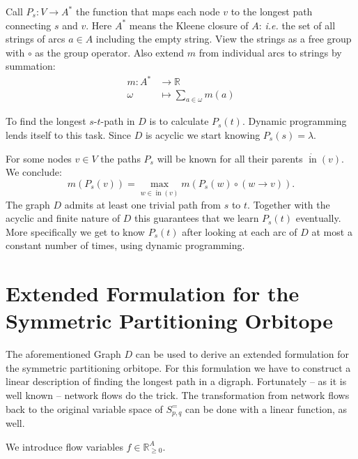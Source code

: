 \documentclass[a4paper]{amsart}
\theoremstyle{lemma}
\theoremstyle{definition}
\theoremstyle{remark}
\theoremstyle{example}
\def\ie{\emph{i.e.}}
\DeclareMathOperator{\In}{in}
\newcommand{\inv}{\ensuremath{\dot{\In}}}
\newcommand{\lr}[1]{\ensuremath{\left( #1 \right)}}
\begin{document}
Call \(P_s \colon V \to A^* \) the function that maps each node \(v\)
to the longest path connecting \(s\) and \(v\).  Here \(A^*\) means
the Kleene closure of \(A\): \ie{} the set of all strings of arcs \(a
\in A\) including the empty string.  View the strings as a free group
with \(\circ{}\) as the group operator.  Also extend \(m\) from individual arcs to strings by summation:
\begin{align*}
m \colon A^* &\to \mathbb{R} \\
\omega &\mapsto \sum_{a\in \omega} m \lr{a}
\end{align*}

To find the longest \(s\)-\(t\)-path in \(D\) is to calculate
\(P_s (t)\).  Dynamic programming lends itself to this task.  Since
\(D\) is acyclic we start knowing \(P_s (s) = \lambda\).

For some nodes \(v \in V\) the paths \(P_s\) will be known for all their parents \(\inv{} \lr{v} \).  We conclude:
\[m\lr{P_s \lr{v}} = \max_{w \in \inv(v)}
m\lr{P_s(w) \circ{} \lr{w \rightarrow v }}\text{.}\]
The graph \(D\) admits at least one trivial path from \(s\) to \(t\).
Together with the acyclic and finite nature of \(D\) this guarantees that we
learn \(P_s (t)\) eventually.  More specifically we get to know \(P_s
(t)\) after looking at each arc of \(D\) at most a constant number of
times, using dynamic programming.




\section{Extended Formulation for the Symmetric Partitioning Orbitope}
The aforementioned Graph \(D\) can be used to derive an extended
formulation for the  symmetric partitioning orbitope.  For this
formulation we have to construct a linear description of finding the
longest path in a digraph.  Fortunately -- as it is well known --
network flows do the trick.  The transformation from network flows
back to the original variable space of \(S^=_{p, q}\) can be done with
a linear function, as well.

We introduce flow variables \(f \in \mathbb{R}^A_{\geq 0}\).  
\end{document}
